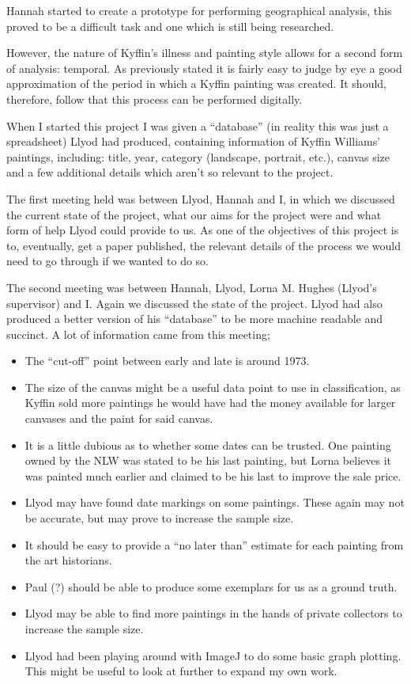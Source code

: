 Hannah started to create a prototype for performing geographical analysis, this proved to be a 
difficult task and one which is still being researched.

However, the nature of Kyffin's illness and painting style allows for a second form of analysis:
temporal. As previously stated it is fairly easy to judge by eye a good approximation of the 
period in which a Kyffin painting was created. It should, therefore, follow that this process can
be performed digitally.

When I started this project I was given a ``database'' (in reality this was just a spreadsheet) 
Llyod had produced, containing information of Kyffin Williams' paintings, including: title, year,
category (landscape, portrait, etc.), canvas size and a few additional details which aren't so 
relevant to the project.

The first meeting held was between Llyod, Hannah and I, in which we discussed the current state of
the project, what our aims for the project were and what form of help Llyod could provide to us.
As one of the objectives of this project is to, eventually, get a paper published, the relevant
details of the process we would need to go through if we wanted to do so.

The second meeting was between Hannah, Llyod, Lorna M. Hughes (Llyod's supervisor) and I. Again we
discussed the state of the project. Llyod had also produced a better version of his ``database'' 
to be more machine readable and succinct. A lot of information came from this meeting;

\begin{itemize}
\item The ``cut-off'' point between early and late is around 1973.
\item The size of the canvas might be a useful data point to use in classification, as Kyffin sold
more paintings he would have had the money available for larger canvases and the paint for said
canvas.
\item It is a little dubious as to whether some dates can be trusted. One painting owned by the
NLW was stated to be his last painting, but Lorna believes it was painted much earlier and claimed
to be his last to improve the sale price.
\item Llyod may have found date markings on some paintings. These again may not be accurate, but
may prove to increase the sample size.
\item It should be easy to provide a ``no later than'' estimate for each painting from the art
historians.
\item Paul (?) should be able to produce some exemplars for us as a ground truth.
\item Llyod may be able to find more paintings in the hands of private collectors to increase the 
sample size.
\item Llyod had been playing around with ImageJ to do some basic graph plotting. This might be 
useful to look at further to expand my own work.
\end{itemize}

